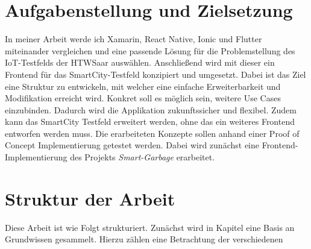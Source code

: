 \section{Aufgabenstellung und Zielsetzung}
In meiner Arbeit werde ich Xamarin, React Native, Ionic und Flutter miteinander vergleichen und eine passende Lösung für die Problemstellung des IoT-Testfelds der HTWSaar auswählen. Anschließend wird mit dieser ein Frontend für das SmartCity-Testfeld konzipiert und umgesetzt. Dabei ist das Ziel eine Struktur zu entwickeln, mit welcher eine einfache Erweiterbarkeit und Modifikation erreicht wird. Konkret soll es möglich sein, weitere Use Cases einzubinden. Dadurch wird die Applikation zukunftssicher und flexibel. Zudem kann das SmartCity Testfeld erweitert werden, ohne das ein weiteres Frontend entworfen werden muss. Die erarbeiteten Konzepte sollen anhand einer Proof of Concept Implementierung getestet werden. Dabei wird zunächst eine Frontend-Implementierung des Projekts \textit{Smart-Garbage} erarbeitet.

\section{Struktur der Arbeit}
Diese Arbeit ist wie Folgt strukturiert. Zunächst wird in Kapitel eine Basis an Grundwissen gesammelt. Hierzu zählen eine Betrachtung der verschiedenen 


